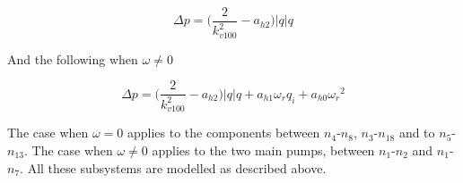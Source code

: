 \begin{equation}
  \Delta p = \Big(\frac{2}{k_{v100}^2} - a_{h2}\Big)|q| q 
  \label{omega_zero}
\end{equation}

And the following when $\omega \neq 0$

\begin{equation}
  \Delta p = \Big(\frac{2}{k_{v100}^2} - a_{h2}\Big)|q| q  + a_{h1} \omega_r q_i + a_{h0}{\omega_r}^2
  \label{omega_notzero}
\end{equation}

The case when $\omega = 0$ applies to the components between $n_4$-$n_8$, $n_3$-$n_{18}$  and to $n_5$-$n_{13}$. The case when $\omega \neq 0$ applies to the two main pumps, between $n_1$-$n_2$ and $n_1$-$n_7$. All these subsystems are modelled as described above. 